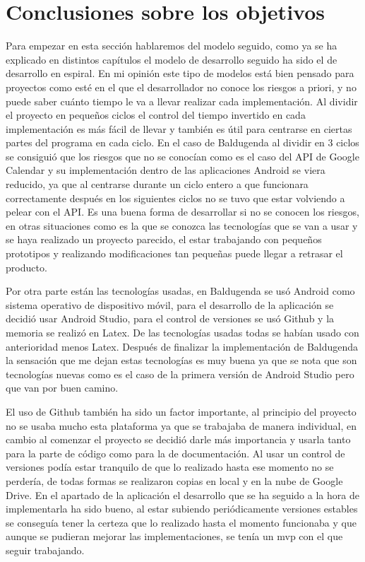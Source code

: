 \section{Conclusiones sobre los objetivos}
\label{secc:Conclusiones sobre los objetivos}

Para empezar en esta sección hablaremos del modelo seguido, como ya se ha explicado en distintos capítulos el modelo de desarrollo seguido ha sido el de desarrollo en espiral. En mi opinión este tipo de modelos está bien pensado para proyectos como esté en el que el desarrollador no conoce los riesgos a priori, y no puede saber cuánto tiempo le va a llevar realizar cada implementación. Al dividir el proyecto en pequeños ciclos el control del tiempo invertido en cada implementación es más fácil de llevar y también es útil para centrarse en ciertas partes del programa en cada ciclo. En el caso de Baldugenda al dividir en 3 ciclos se consiguió que los riesgos que no se conocían como es el caso del API de Google Calendar y su implementación dentro de las aplicaciones Android se viera reducido, ya que al centrarse durante un ciclo entero a que funcionara correctamente después en los siguientes ciclos no se tuvo que estar volviendo a pelear con el API. Es una buena forma de desarrollar si no se conocen los riesgos, en otras situaciones como es la que se conozca las tecnologías que se van a usar y se haya realizado un proyecto parecido, el estar trabajando con pequeños prototipos y realizando modificaciones tan pequeñas puede llegar a retrasar el producto.

Por otra parte están las tecnologías usadas, en Baldugenda se usó Android como sistema operativo de dispositivo móvil, para el desarrollo de la aplicación se decidió usar Android Studio, para el control de versiones se usó Github y la memoria se realizó en Latex. De las tecnologías usadas todas se habían usado con anterioridad menos Latex. Después de finalizar la implementación de Baldugenda  la sensación que me dejan estas tecnologías es muy buena ya que se nota que son tecnologías nuevas como es el caso de la primera versión de Android Studio pero que van por buen camino. 

El uso de Github también ha sido un factor importante, al principio del proyecto no se usaba mucho esta plataforma ya que se trabajaba de manera individual, en cambio al comenzar el proyecto se decidió darle más importancia y usarla tanto para la parte de código como para la de documentación. Al usar un control de versiones podía estar tranquilo de que lo realizado hasta ese momento no se perdería, de todas formas se realizaron copias en local y en la nube de Google Drive.
\newpage
En el apartado de la aplicación el desarrollo que se ha seguido a la hora de implementarla ha sido bueno, al estar subiendo periódicamente versiones estables se conseguía tener la certeza que lo realizado hasta el momento funcionaba y que aunque se pudieran mejorar las implementaciones, se tenía un \acrshort{mvp} con el que seguir trabajando.

